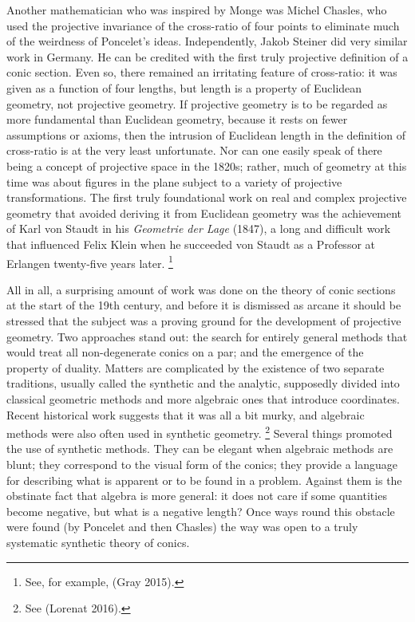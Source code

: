 Another mathematician who was inspired by Monge was Michel Chasles,
who used the projective invariance of the cross-ratio of four points
to eliminate much of the weirdness of Poncelet's ideas. Independently,
Jakob Steiner did very similar work in Germany. He can be credited
with the first truly projective definition of a conic section. Even so,
there remained an irritating feature of cross-ratio: it was given as a
function of four lengths, but length is a property of Euclidean geometry,
not projective geometry.  If projective geometry is to be regarded as
more fundamental than Euclidean geometry, because it rests on fewer
assumptions or axioms, then the intrusion of Euclidean length in the
definition of cross-ratio is at the very least unfortunate. Nor can one
easily speak of there being a concept of projective space in the 1820s;
rather, much of geometry at this time was about figures in the plane
subject to a variety of projective transformations. The first truly
foundational work on real and complex projective geometry that avoided
deriving it from Euclidean geometry was the achievement of Karl von Staudt
in his \emph{Geometrie der Lage} (1847), a long and difficult work that
influenced Felix Klein when he succeeded von Staudt as a Professor at
Erlangen twenty-five years later.%
%
\footnote{See, for example, (Gray 2015).}

All in all, a surprising amount of work was done on the theory of conic
sections  at the start of the 19th century, and before it is dismissed
as arcane it should be stressed that the subject was a proving ground
for the development of projective geometry. Two approaches stand out: the
search for entirely  general methods that would treat all non-degenerate
conics on a par; and the emergence of the property of duality. Matters
are complicated by the existence of two separate traditions, usually
called the synthetic and the analytic, supposedly divided into classical
geometric methods and more algebraic ones that introduce coordinates.
Recent historical work suggests that it was all a bit murky, and algebraic
methods were also often used in synthetic geometry.%
%
\footnote{See (Lorenat 2016).} 
%
Several things promoted the use of synthetic methods. They can
be elegant when algebraic methods are blunt; they correspond to the
visual form of the conics; they provide a language for describing what
is apparent or to be found in a problem. Against them is the obstinate
fact that algebra is more general: it does not care if some quantities
become negative, but what is a negative length? Once ways round this
obstacle were found (by Poncelet and then Chasles) the way was open to
a truly systematic synthetic theory of conics.

